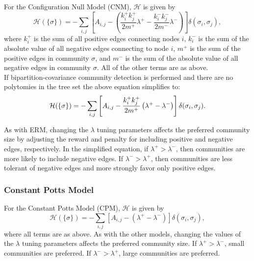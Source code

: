 \documentclass[11pt]{article}
\begin{document}
For the Configuration Null Model (CNM), $\mathcal{H}$ is given by
\begin{equation}\label{eq:CNModel1}
\mathcal{H}(\{\sigma\}) = - \displaystyle\sum_{i,j} \left[A_{i,j} -  \left(\frac{k_{i}^{+} k_{j}^{+}}{2m^{+}} \lambda^{+} - \frac{k_{i}^{-} k_{j}^{-}}{2m^{-}} \lambda^{-}\right)\right]\delta(\sigma_{i}, \sigma_{j}),
\end{equation}
where $k_{i}^{+}$ is the sum of all positive edges connecting nodes $i$, $k_{i}^{-}$ is the sum of the absolute value of all negative edges connecting to node $i$, $m^{+}$ is the sum of the positive edges in community $\sigma$, and $m^{-}$ is the sum of the absolute value of all negative edges in community $\sigma$. All of the other terms are as above. \\


If bipartition-covariance community detection is performed and there are no polytomies in
the tree set the above equation simplifies to:
\begin{equation}\label{eq:CNModel2}
\mathcal{H}(\{\sigma\}) = - \displaystyle\sum_{i,j} \left[A_{i,j} -  \frac{k_{i}^{+} k_{j}^{+}}{2m^{+}} \left(\lambda^{+} - \lambda^{-}\right)\right]\delta(\sigma_{i}, \sigma_{j}). \\
\end{equation}


As with ERM, changing the $\lambda$ tuning parameters affects the preferred community size by
adjusting the reward and penalty for including positive and negative edges, respectively. In
the simplified equation, if $\lambda^{+} > \lambda^{-}$, then communities are more likely to include negative edges. If $\lambda^{-} > \lambda^{+}$, then communities are less tolerant of negative edges and more strongly favor only positive edges. \\


\subsubsection{Constant Potts Model}\label{appendix:CPModel}

For the Constant Potts Model (CPM), $\mathcal{H}$ is given by
\begin{equation}\label{eq:CNModel2CPM}
\mathcal{H}(\{\sigma\}) = - \displaystyle\sum_{i,j} \left[A_{i,j} -  \left(\lambda^{+} - \lambda^{-}\right)\right]\delta(\sigma_{i}, \sigma_{j}),
\end{equation}
where all terms are as above. As with the other models, changing the values of the $\lambda$ tuning
parameters affects the preferred community size. If $\lambda^{+} > \lambda^{-}$, small communities are preferred. If $\lambda^{-} > \lambda^{+}$, large communities are preferred. \\


\newpage
\end{document}
